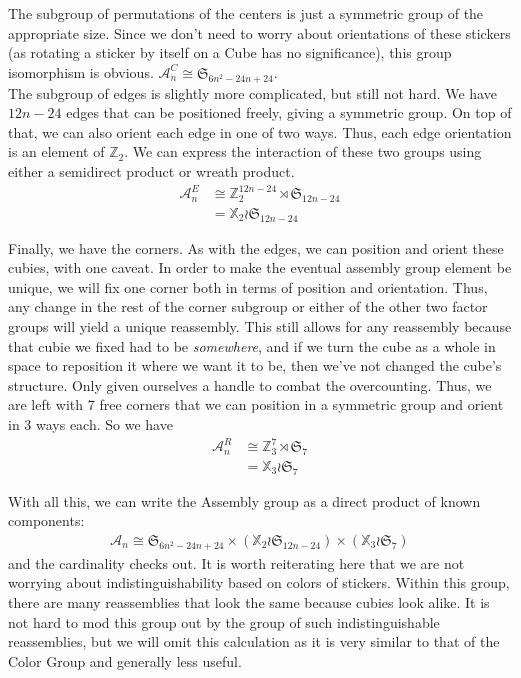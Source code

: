 \documentclass[10pt,letterpaper]{report}
\begin{document}
The subgroup of permutations of the centers is just a symmetric group of the appropriate size.  Since we don't need to worry about orientations of these stickers (as rotating a sticker by itself on a Cube has no significance), this group isomorphism is obvious. $ \mathcal{A}_n^C \cong \mathfrak{S}_{6n^2 - 24n + 24}$. \\

The subgroup of edges is slightly more complicated, but still not hard.  We have $12n-24$ edges that can be positioned freely, giving a symmetric group.  On top of that, we can also orient each edge in one of two ways.  Thus, each edge orientation is an element of $\mathbb{Z}_2$.  We can express the interaction of these two groups using either a semidirect product or wreath product.\begin{align*}
\mathcal{A}_n^E 
&\cong\mathbb{Z}_2^{12n-24} \rtimes \mathfrak{S}_{12n-24} \\
&= \mathbb{X}_2 \wr \mathfrak{S}_{12n-24}
\end{align*}

Finally, we have the corners.  As with the edges, we can position and orient these cubies, with one caveat.  In order to make the eventual assembly group element be unique, we will fix one corner both in terms of position and orientation.  Thus, any change in the rest of the corner subgroup or either of the other two factor groups will yield a unique reassembly.  This still allows for any reassembly because that cubie we fixed had to be \textit{somewhere}, and if we turn the cube as a whole in space to reposition it where we want it to be, then we've not changed the cube's structure.  Only given ourselves a handle to combat the overcounting.  Thus, we are left with 7 free corners that we can position in a symmetric group and orient in 3 ways each.  So we have \begin{align*}
\mathcal{A}_n^R
&\cong\mathbb{Z}_3^7 \rtimes \mathfrak{S}_7 \\
&= \mathbb{X}_3 \wr \mathfrak{S}_7
\end{align*}

With all this, we can write the Assembly group as a direct product of known components:
\begin{align*}
\mathcal{A}_n \cong
\mathfrak{S}_{6n^2 - 24n + 24} \times
(\mathbb{X}_2 \wr \mathfrak{S}_{12n-24}) \times
(\mathbb{X}_3 \wr \mathfrak{S}_7)
\end{align*}
and the cardinality checks out.  It is worth reiterating here that we are not worrying about indistinguishability based on colors of stickers.  Within this group, there are many reassemblies that look the same because cubies look alike.  It is not hard to mod this group out by the group of such indistinguishable reassemblies, but we will omit this calculation as it is very similar to that of the Color Group and generally less useful. \\
\end{document}
